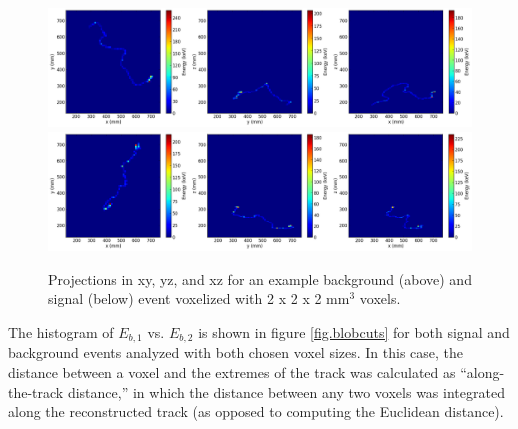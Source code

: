 \documentclass[a4paper,11pt]{article}
\begin{document}
\begin{figure}[!htb]
	\centering
	\includegraphics[scale=0.36]{fig/plt_h2D_vox_dnn3d_NEXT100_Paolina222_v2x2x2_r200x200x200_0_bg.png}
	\includegraphics[scale=0.36]{fig/plt_h2D_vox_dnn3d_NEXT100_Paolina222_v2x2x2_r200x200x200_2_si.png}
	\caption{\label{fig.exampleProjs222}Projections in xy, yz, and xz for an example background (above) and signal (below) event voxelized with 2 x 2 x 2 mm$^3$ voxels.}
\end{figure}

The histogram of $E_{b,1}$ vs. $E_{b,2}$ is shown in figure \ref{fig.blobcuts} for both signal and
background events analyzed with both chosen voxel sizes.  In this case, the distance between a voxel and the extremes of the track was calculated as 
``along-the-track distance,'' in which the distance between any two voxels was integrated along the reconstructed track (as opposed to computing the Euclidean distance). 
\end{document}
